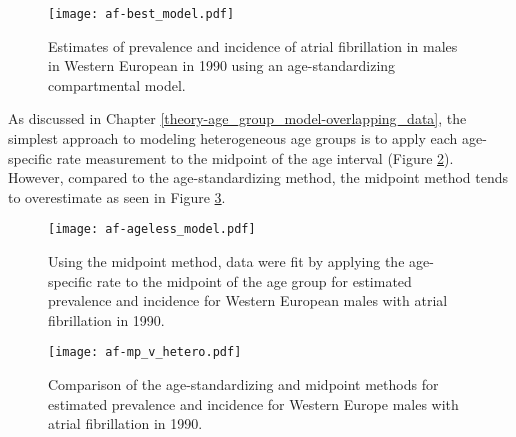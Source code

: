     \begin{figure}[h]
        \begin{center}
            \texttt{[image: af-best\_model.pdf]}
            \caption{Estimates of prevalence and incidence of atrial fibrillation in males in Western European in 1990 using an age-standardizing compartmental model.}
            \label{fig:app-af age-stand}
        \end{center}
    \end{figure}

As discussed in Chapter \ref{theory-age_group_model-overlapping_data}, the simplest approach to modeling heterogeneous age groups is to apply each age-specific rate measurement to the midpoint of the age interval (Figure \ref{fig:app-af mp data}).  However, compared to the age-standardizing method, the midpoint method tends to overestimate as seen in Figure \ref{fig:app-af compare}.

    \begin{figure}[h]
        \begin{center}
            \texttt{[image: af-ageless\_model.pdf]}
            \caption{Using the midpoint method, data were fit by applying the age-specific rate to the midpoint of the age group for estimated prevalence and incidence for Western European males with atrial fibrillation in 1990.}
            \label{fig:app-af mp data}
        \end{center}
    \end{figure}

    \begin{figure}[h]
        \begin{center}
            \texttt{[image: af-mp\_v\_hetero.pdf]}
            \caption{Comparison of the age-standardizing and midpoint methods for estimated prevalence and incidence for Western Europe males with atrial fibrillation in 1990.}
            \label{fig:app-af compare}
        \end{center}
    \end{figure}
